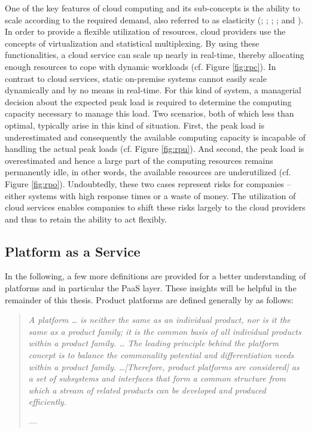 One of the key features of cloud computing and its sub-concepts is the ability to scale according to the required demand, also referred to as elasticity (\citealp[p. 4]{Foster2008}; \citealp[pp. 52-54]{Armbrust2010}; \citealp[p. 126]{Iyer2010}; \citealp[pp. 9-10]{Zhang2010}; and \citealp[p. 2]{Mell2011}). In order to provide a flexible utilization of resources, cloud providers use the concepts of virtualization and statistical multiplexing. By using these functionalities, a cloud service can scale up nearly in real-time, thereby allocating enough resources to cope with dynamic workloads (cf. Figure \ref{fig:rpc}). In contrast to cloud services, static on-premise systems cannot easily scale dynamically and by no means in real-time. For this kind of system, a managerial decision about the expected peak load is required to determine the computing capacity necessary to manage this load. Two scenarios, both of which less than optimal, typically arise in this kind of situation. First, the peak load is underestimated and consequently the available computing capacity is incapable of handling the actual peak loads (cf. Figure \ref{fig:rpu}). And second, the peak load is overestimated and hence a large part of the computing resources remains permanently idle, in other words, the available resources are underutilized (cf. Figure \ref{fig:rpo}). Undoubtedly, these two cases represent risks for companies -- either systems with high response times or a waste of money. The utilization of cloud services enables companies to shift these risks largely to the cloud providers and thus to retain the ability to act flexibly.

\subsection{Platform as a Service}\label{ch:tf:paas:def}

In the following, a few more definitions are provided for a better understanding of platforms and in particular the \ac{PaaS} layer. These insights will be helpful in the remainder of this thesis. Product platforms are defined generally by \citet{Halman2003} as follows:

\begin{quotation}{\slshape 
A platform \ldots\xspace is neither the same as an individual product, nor is it the same as a product family; it is the common basis of all individual products within a product family. \ldots\xspace The leading principle behind the platform concept is to balance the commonality potential and differentiation needs within a product family. \ldots\xspace [Therefore, product platforms are considered] as a set of subsystems and interfaces that form a common structure from which a stream of related products can be developed and produced efficiently.}
\vspace*{-7pt}
\begin{flushright}
	--- \citealp[pp. 150-151]{Halman2003}
\end{flushright}
\end{quotation}

